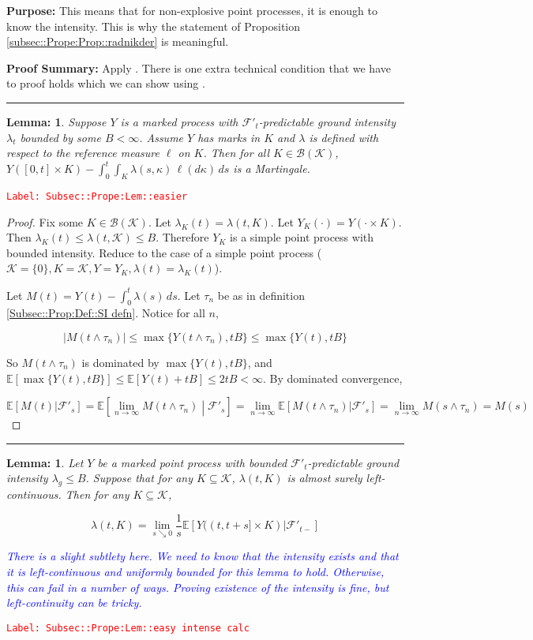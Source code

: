 \documentclass[12pt]{article}
\newcommand{\mb}{\mathbb}
\newcommand{\mc}{\mathcal}
\newcommand{\ms}{\mathscr}
\newcommand{\ra}{\rightarrow}
\newcommand{\tr}{\textcolor{red}}
\newcommand{\tb}{\textcolor{blue}}
\newcommand{\labe}[1]{\tr{\texttt{Label: #1}}}
\newcommand{\purpose}{\textbf{Purpose: }}
\newcommand{\pfsum}{\textbf{Proof Summary: }}
\newcommand{\lin}{\rule{\linewidth}{0.4 pt}}
\newcommand{\ex}[1]{\mb{E}\left[#1\right]}			%
\newtheorem{lem}[thms]{Lemma: }
\begin{document}
\purpose This means that for non-explosive point processes, it is enough to know the intensity. This is why the statement of Proposition \ref{subsec::Prope:Prop::radnikder} is meaningful.

\pfsum Apply \cite[Propositions 14.3.II(b),14.2.IV(c) and 9.2.III]{DalVer08}. There is one extra technical condition that we have to proof holds which we can show using \cite[Proposition A1.5.III]{DalVer03}.

\lin

\begin{lem}
Suppose \(Y\) is a marked process with \(\mc{F}'_t\)-predictable ground intensity \(\lambda_t\) bounded by some \(B < \infty\). Assume \(Y\) has marks in \(K\) and \(\lambda\) is defined with respect to the reference measure \(\ell\) on \(K\). Then for all \(K \in \ms{B}(\mc{K})\), \(Y([0,t]\times K) - \int_0^t\int_K \lambda(s,\kappa)\,\ell(d\kappa)\,ds\) is a Martingale.
\label{Subsec::Prope:Lem::easier}
\end{lem}
\labe{Subsec::Prope:Lem::easier}

\begin{proof}
Fix some \(K \in \ms{B}(\mc{K})\). Let \(\lambda_K(t) = \lambda(t,K)\). Let \(Y_K(\cdot) = Y(\cdot\times K)\). Then \(\lambda_K(t) \leq \lambda(t,\mc{K}) \leq B\). Therefore \(Y_K\) is a simple point process with bounded intensity. Reduce to the case of a simple point process (\(\mc{K} = \{0\}, K = \mc{K}, Y = Y_K,\lambda(t) = \lambda_K(t)\)).

Let \(M(t) = Y(t) - \int_0^t \lambda(s)\,ds\). Let \(\tau_n\) be as in definition \ref{Subsec::Prop:Def::SI defn}. Notice for all \(n\),

\[|M(t\wedge \tau_n)| \leq \max\{Y(t\wedge \tau_n),tB\}\leq \max\{Y(t),tB\}\]

So \(M(t\wedge\tau_n)\) is dominated by \(\max\{Y(t),tB\}\), and \(\ex{\max\{Y(t),tB\}} \leq \ex{Y(t) + tB} \leq 2tB < \infty\). By dominated convergence,

\[\ex{M(t)|\mc{F}'_s} = \ex{\lim_{n\ra\infty} M(t\wedge \tau_n)\middle|\mc{F}'_s} = \lim_{n\ra\infty}\ex{M(t\wedge \tau_n)|\mc{F}'_s} = \lim_{n\ra\infty} M(s\wedge \tau_n) = M(s)\]
\end{proof}

\lin

\begin{lem}
Let \(Y\) be a marked point process with bounded \(\mc{F}'_t\)-predictable ground intensity \(\lambda_g\leq B\). Suppose that for any \(K \subseteq \mc{K}\), \(\lambda(t,K)\) is almost surely left-continuous. Then for any \(K \subseteq \mc{K}\),

\[\lambda(t,K) = \lim_{s\searrow 0}\frac{1}{s}\ex{Y((t,t+s]\times K)|\mc{F}'_{t-}}\]

\tb{There is a slight subtlety here. We need to know that the intensity exists and that it is left-continuous and uniformly bounded for this lemma to hold. Otherwise, this can fail in a number of ways. Proving existence of the intensity is fine, but left-continuity can be tricky.}

\label{Subsec::Prope:Lem::easy intense calc}
\end{lem}
\labe{Subsec::Prope:Lem::easy intense calc}
\end{document}
